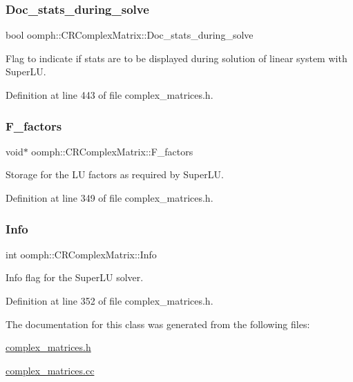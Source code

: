 \subsubsection{\texorpdfstring{Doc\+\_\+stats\+\_\+during\+\_\+solve}{Doc\_stats\_during\_solve}}
{\footnotesize\ttfamily bool oomph\+::\+C\+R\+Complex\+Matrix\+::\+Doc\+\_\+stats\+\_\+during\+\_\+solve\hspace{0.3cm}{\ttfamily [protected]}}



Flag to indicate if stats are to be displayed during solution of linear system with Super\+LU. 



Definition at line 443 of file complex\+\_\+matrices.\+h.

\mbox{\label{classoomph_1_1CRComplexMatrix_a1c005b277efb26453ac04d753378946f}} 
\subsubsection{\texorpdfstring{F\+\_\+factors}{F\_factors}}
{\footnotesize\ttfamily void$\ast$ oomph\+::\+C\+R\+Complex\+Matrix\+::\+F\+\_\+factors\hspace{0.3cm}{\ttfamily [private]}}



Storage for the LU factors as required by Super\+LU. 



Definition at line 349 of file complex\+\_\+matrices.\+h.

\mbox{\label{classoomph_1_1CRComplexMatrix_adb7e147717d66f466c46178a403fe630}} 
\subsubsection{\texorpdfstring{Info}{Info}}
{\footnotesize\ttfamily int oomph\+::\+C\+R\+Complex\+Matrix\+::\+Info\hspace{0.3cm}{\ttfamily [private]}}



Info flag for the Super\+LU solver. 



Definition at line 352 of file complex\+\_\+matrices.\+h.



The documentation for this class was generated from the following files\+:\begin{DoxyCompactItemize}
\item 
\hyperlink{complex__matrices_8h}{complex\+\_\+matrices.\+h}\item 
\hyperlink{complex__matrices_8cc}{complex\+\_\+matrices.\+cc}\end{DoxyCompactItemize}
